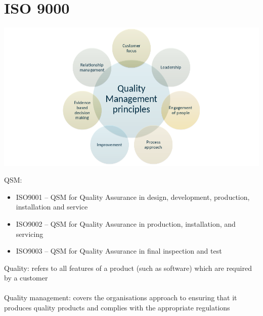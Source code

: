 \documentclass{article}[18pt]
\begin{document}
\section{ISO 9000}
\begin{center}
	\includegraphics[scale=0.7]{ISO9000}
\end{center}
QSM:
\begin{itemize}
	\item ISO9001 – QSM for Quality Assurance in design, development, production, installation and service
	\item ISO9002 – QSM for Quality Assurance in production, installation, and servicing
	\item ISO9003 – QSM for Quality Assurance in final inspection and test
\end{itemize}
Quality: refers to all features of a product (such as software) which are required by a customer\\
\\
Quality management: covers the organisations approach to ensuring that it produces quality products and complies with the appropriate regulations
\end{document}
